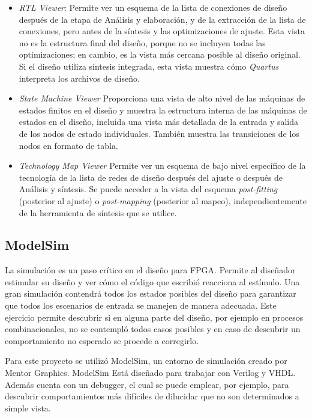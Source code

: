 \begin{itemize}
\item
\textit{RTL Viewer}:
Permite ver un esquema de la lista de conexiones de diseño después de la etapa de Análisis y elaboración, y de la extracción de la lista de conexiones, pero antes de la síntesis y las optimizaciones de ajuste. Esta vista no es la estructura final del diseño, porque no se incluyen todas las optimizaciones; en cambio, es la vista más cercana posible al diseño original. Si el diseño utiliza síntesis integrada, esta vista muestra cómo \textit{Quartus} interpreta los archivos de diseño.

\item
\textit{State Machine Viewer}
Proporciona una vista de alto nivel de las máquinas de estados finitos en el diseño y muestra la estructura interna de las máquinas de estados en el diseño, incluida una vista más detallada de la entrada y salida de los nodos de estado individuales. También muestra las transiciones de los nodos en formato de tabla.

\item
\textit{Technology Map Viewer}
Permite ver un esquema de bajo nivel específico de la tecnología de la lista de redes de diseño después del ajuste o después de Análisis y síntesis. Se puede acceder a la vista del esquema \textit{post-fitting} (posterior al ajuste) o \textit{post-mapping} (posterior al mapeo), independientemente de la herramienta de síntesis que se utilice.

\end{itemize}


\subsection{ModelSim}

La simulación es un paso crítico en el diseño para FPGA. Permite al diseñador estimular su diseño y ver cómo el código que escribió reacciona al estímulo. Una gran simulación contendrá todos los estados posibles del diseño para garantizar que todos los escenarios de entrada se manejen de manera adecuada. Este ejercicio permite descubrir si en alguna parte del diseño, por ejemplo en procesos combinacionales,  no se contempló todos casos posibles y en caso de descubrir un comportamiento no esperado se procede a corregirlo.

Para este proyecto se utilizó ModelSim, un entorno de simulación creado por Mentor Graphics. ModelSim Está diseñado para trabajar con Verilog y VHDL. Además cuenta con un debugger, el cual se puede emplear, por ejemplo, para descubrir comportamientos más difíciles de dilucidar que no son determinados a simple vista.

